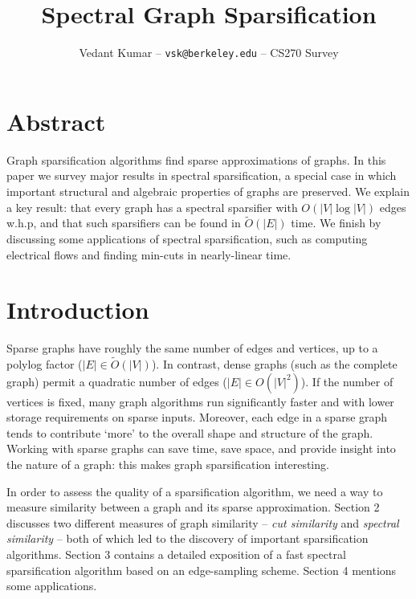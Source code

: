\documentclass{article}
\title{Spectral Graph Sparsification}
\author{\small{Vedant Kumar -- \texttt{vsk@berkeley.edu} -- CS270 Survey}}
\begin{document}
\maketitle

\newcommand \cut[1]{\text{cut}_{#1}}
\newcommand \textlcsc[1]{\textsc{\MakeLowercase{#1}}}
\newcommand \Tr{\text{Tr}}

\section*{Abstract}

Graph sparsification algorithms find sparse approximations of graphs. In
this paper we survey major results in spectral sparsification, a special
case in which important structural and algebraic properties of graphs are
preserved. We explain a key result: that every graph has a spectral
sparsifier with $O(|V|\log|V|)$ edges w.h.p, and that such sparsifiers can
be found in $\tilde{O}(|E|)$ time. We finish by discussing some applications
of spectral sparsification, such as computing electrical flows and finding
min-cuts in nearly-linear time.

\section{Introduction}

Sparse graphs have roughly the same number of edges and vertices, up to a
polylog factor ($|E| \in \tilde{O}(|V|)$). In contrast, dense graphs (such
as the complete graph) permit a quadratic number of edges ($|E| \in
O(|V|^2)$). If the number of vertices is fixed, many graph algorithms run
significantly faster and with lower storage requirements on sparse inputs.
Moreover, each edge in a sparse graph tends to contribute `more' to the
overall shape and structure of the graph.  Working with sparse graphs can
save time, save space, and provide insight into the nature of a graph: this
makes graph sparsification interesting.

In order to assess the quality of a sparsification algorithm, we need a way
to measure similarity between a graph and its sparse approximation. Section
2 discusses two different measures of graph similarity -- \textit{cut
similarity} and \textit{spectral similarity} -- both of which led to the
discovery of important sparsification algorithms. Section 3 contains a
detailed exposition of a fast spectral sparsification algorithm based on an
edge-sampling scheme. Section 4 mentions some applications.
\end{document}
